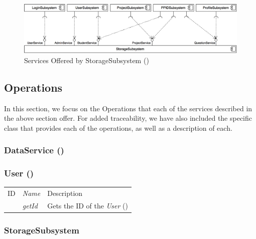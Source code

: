 \documentclass[12pt,letterpaper]{article}
\begin{document}
\begin{figure}[H]
	\centering{}
	\includegraphics[scale=0.27]{imgs/d3/services/storage-subsystem.png}
	\caption{Services Offered by StorageSubsystem ()}
\end{figure}

\subsection{Operations}

In this section, we focus on the Operations that each of the services described in the above section offer. For added traceability, we have also included the specific class that provides each of the operations, as well as a description of each.

\subsubsection{DataService ()}
\subsubsection*{User ()}
\begin{center}
	\begin{tabu} to 
		\tableheader{}ID & Name & Description \\
         & getId & Gets the ID of the \textit{User} () \\
	\end{tabu}
\end{center}

\subsubsection*{StorageSubsystem}
\end{document}
